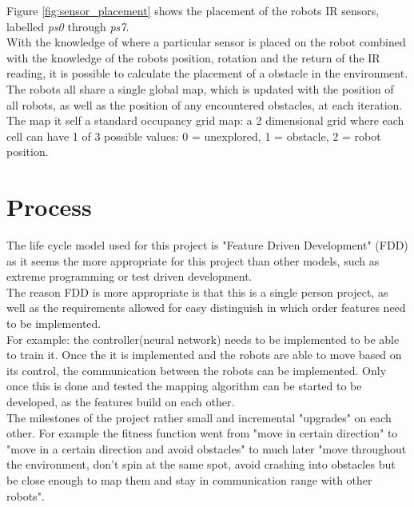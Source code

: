 Figure \ref{fig:sensor_placement} shows the placement of the robots IR sensors, labelled \textit{ps0} through \textit{ps7}.\\
With the knowledge of where a particular sensor is placed on the robot combined with the knowledge of the robots position, rotation and the return of the IR reading, it is possible to calculate the placement of a obstacle in the environment.\\

The robots all share a single global map, which is updated with the position of all robots, as well as the position of any encountered obstacles, at each iteration. \\
The map it self a standard occupancy grid map: a 2 dimensional grid where each cell can have 1 of 3 possible values: 0 = unexplored, 1 = obstacle, 2 = robot position.  

\section{Process}
The life cycle model used for this project is "Feature Driven Development" (FDD) as it seems the more appropriate for this project than other models, such as extreme programming or test driven development. \\
The reason FDD is more appropriate is that this is a single person project, as well as the requirements allowed for easy distinguish in which order features need to be implemented.  \\
For example: the controller(neural network) needs to be implemented to be able to train it. Once the it is implemented and the robots are able to move based on its control, the communication between the robots can be implemented. Only once this is done and tested the mapping algorithm can be started to be developed, as the features build on each other.\\

The milestones of the project rather small and incremental "upgrades" on each other. For example the fitness function went from "move in certain direction" to "move in a certain direction and avoid obstacles" to much later "move throughout the environment, don't spin at the same spot, avoid crashing into obstacles but be close enough to map them and stay in communication range with other robots". \\
 


